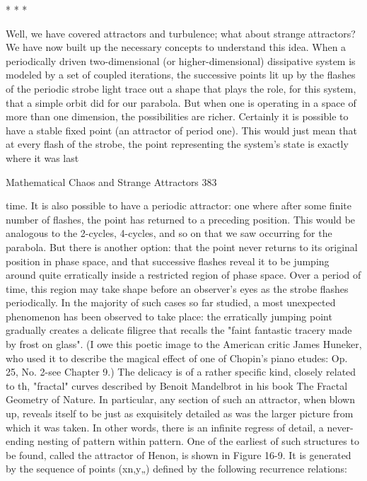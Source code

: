                                      *       *       *

Well, we have covered attractors and turbulence; what about strange attractors? We
have now built up the necessary concepts to understand this idea. When a periodically
driven two-dimensional (or higher-dimensional) dissipative system is modeled by a
set of coupled iterations, the successive points lit up by the flashes of the periodic
strobe light trace out a shape that plays the role, for this system, that a simple orbit did
for our parabola. But when one is operating in a space of more than one dimension,
the possibilities are richer. Certainly it is possible to have a stable fixed point (an
attractor of period one). This would just mean that at every flash of the strobe, the
point representing the system's state is exactly where it was last




Mathematical Chaos and Strange Attractors                                               383

time. It is also possible to have a periodic attractor: one where after some finite
number of flashes, the point has returned to a preceding position. This would be
analogous to the 2-cycles, 4-cycles, and so on that we saw occurring for the parabola.
        But there is another option: that the point never returns to its original position
in phase space, and that successive flashes reveal it to be jumping around quite
erratically inside a restricted region of phase space. Over a period of time, this region
may take shape before an observer's eyes as the strobe flashes periodically. In the
majority of such cases so far studied, a most unexpected phenomenon has been
observed to take place: the erratically jumping point gradually creates a delicate
filigree that recalls the "faint fantastic tracery made by frost on glass". (I owe this
poetic image to the American critic James Huneker, who used it to describe the
magical effect of one of Chopin's piano etudes: Op. 25, No. 2-see Chapter 9.) The
delicacy is of a rather specific kind, closely related to th, "fractal" curves described by
Benoit Mandelbrot in his book The Fractal Geometry of Nature. In particular, any
section of such an attractor, when blown up, reveals itself to be just as exquisitely
detailed as was the larger picture from which it was taken. In other words, there is an
infinite regress of detail, a never-ending nesting of pattern within pattern. One of the
earliest of such structures to be found, called the attractor of Henon, is shown in
Figure 16-9. It is generated by the sequence of points (xn,y„) defined by the following
recurrence relations:


